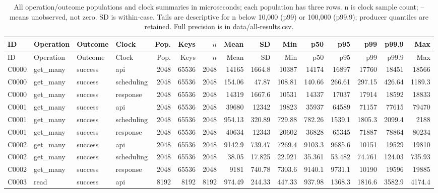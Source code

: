 \begin{landscape}
\scriptsize
\setlength{\tabcolsep}{2pt}
\sloppy
\begin{longtable}{llllrrrrrrrrrrr}
\caption{All operation/outcome populations and clock summaries in microseconds; each population has three rows. n is clock sample count; -- means unobserved, not zero. SD is within-case. Tails are descriptive for n below 10,000 (p99) or 100,000 (p99.9); producer quantiles are retained. Full precision is in data/all-results.csv.}\label{data-latencies}\\
\toprule
ID & Operation & Outcome & Clock & Pop. & Keys & $n$ & Mean & SD & Min & p50 & p95 & p99 & p99.9 & Max\\
\midrule
\endfirsthead
\toprule
ID & Operation & Outcome & Clock & Pop. & Keys & $n$ & Mean & SD & Min & p50 & p95 & p99 & p99.9 & Max\\
\midrule
\endhead
\bottomrule
\endfoot
C0000 & get\_\allowbreak{}many & success & api & 2048 & 65536 & 2048 & 14165 & 1664.8 & 10387 & 14174 & 16897 & 17760 & 18451 & 18566\\
C0000 & get\_\allowbreak{}many & success & scheduling & 2048 & 65536 & 2048 & 154.06 & 47.87 & 108.81 & 140.66 & 266.61 & 297.15 & 426.64 & 1189.3\\
C0000 & get\_\allowbreak{}many & success & response & 2048 & 65536 & 2048 & 14319 & 1667.6 & 10531 & 14337 & 17037 & 17914 & 18592 & 18833\\
C0001 & get\_\allowbreak{}many & success & api & 2048 & 65536 & 2048 & 39680 & 12342 & 19823 & 35937 & 64589 & 71157 & 77615 & 79470\\
C0001 & get\_\allowbreak{}many & success & scheduling & 2048 & 65536 & 2048 & 954.13 & 320.89 & 729.88 & 782.26 & 1539.1 & 1805.3 & 2099.4 & 2188\\
C0001 & get\_\allowbreak{}many & success & response & 2048 & 65536 & 2048 & 40634 & 12343 & 20602 & 36828 & 65345 & 71887 & 78864 & 80234\\
C0002 & get\_\allowbreak{}many & success & api & 2048 & 65536 & 2048 & 9142.9 & 739.47 & 7269.4 & 9103.3 & 9685.6 & 10151 & 19529 & 19810\\
C0002 & get\_\allowbreak{}many & success & scheduling & 2048 & 65536 & 2048 & 38.05 & 17.825 & 22.921 & 35.361 & 53.482 & 74.761 & 124.03 & 735.93\\
C0002 & get\_\allowbreak{}many & success & response & 2048 & 65536 & 2048 & 9181 & 740.78 & 7303.6 & 9140.1 & 9731.1 & 10190 & 19596 & 19885\\
C0003 & read & success & api & 8192 & 8192 & 8192 & 974.49 & 244.33 & 447.33 & 937.98 & 1368.3 & 1816.6 & 3582.9 & 4174.4\\

\end{longtable}
\end{landscape}
